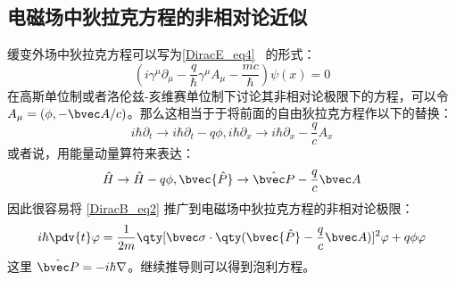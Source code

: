 \subsection{电磁场中狄拉克方程的非相对论近似}
缓变外场中狄拉克方程可以写为\autoref{DiracE_eq4}~ 的形式：
\begin{equation}
(i\gamma^\mu \partial_\mu -\frac{q}{\hbar}\gamma^\mu A_\mu - \frac{mc}{\hbar})\psi(x)=0
\end{equation}
在高斯单位制或者洛伦兹-亥维赛单位制下讨论其非相对论极限下的方程，可以令 $A_\mu=(\phi,-\bvec A/c)$。那么这相当于于将前面的自由狄拉克方程作以下的替换：
\begin{equation}
i\hbar \partial_t \rightarrow i\hbar\partial_t -q\phi, i\hbar\partial_x\rightarrow i\hbar\partial_x - \frac{q}{c}A_x
\end{equation}
或者说，用能量动量算符来表达：
\begin{equation}
\hat H\rightarrow \hat H-q\phi,\bvec{\hat P}\rightarrow \hat {\bvec P}-\frac{q}{c}\bvec A
\end{equation}
因此很容易将 \autoref{DiracB_eq2} 推广到电磁场中狄拉克方程的非相对论极限：
\begin{equation}\label{DiracB_eq3}
i\hbar\pdv{t} \varphi = \frac{1}{2m}\qty[\bvec \sigma \cdot\qty(\bvec {\hat P} - \frac{q}{c}\bvec A)]^2 \varphi + q\phi  \varphi
\end{equation}
这里 $\hat{\bvec P}=-i\hbar\nabla$。继续推导则可以得到泡利方程。